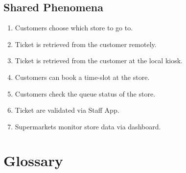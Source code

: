 \subsection{Shared Phenomena}
\begin{enumerate}[label=\textbf{SP.\arabic*}]
	\item Customers choose which store to go to.
	\item Ticket is retrieved from the customer remotely.
	\item Ticket is retrieved from the customer at the local kiosk.
	\item Customers can book a time-slot at the store.
	\item Customers check the queue status of the store.
	\item Ticket are validated via Staff App.
	\item Supermarkets monitor store data via dashboard. 
\end{enumerate}

\section{Glossary}
